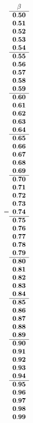  =\hbox{$\begin{array}{c}
 \bf \beta 
  \\ \hline 
\bf  0.50 \\ 
\bf  0.51 \\ 
\bf  0.52 \\ 
\bf  0.53 \\ 
\bf  0.54
  \\ \hline 
\bf  0.55 \\ 
\bf  0.56 \\ 
\bf  0.57 \\ 
\bf  0.58 \\ 
\bf  0.59
  \\ \hline 
\bf  0.60 \\ 
\bf  0.61 \\ 
\bf  0.62 \\ 
\bf  0.63 \\ 
\bf  0.64
  \\ \hline 
\bf  0.65 \\ 
\bf  0.66 \\ 
\bf  0.67 \\ 
\bf  0.68 \\ 
\bf  0.69
  \\ \hline 
\bf  0.70 \\ 
\bf  0.71 \\ 
\bf  0.72 \\ 
\bf  0.73 \\ 
\bf  0.74
  \\ \hline 
\bf  0.75 \\ 
\bf  0.76 \\ 
\bf  0.77 \\ 
\bf  0.78 \\ 
\bf  0.79
  \\ \hline 
\bf  0.80 \\ 
\bf  0.81 \\ 
\bf  0.82 \\ 
\bf  0.83 \\ 
\bf  0.84
  \\ \hline 
\bf  0.85 \\ 
\bf  0.86 \\ 
\bf  0.87 \\ 
\bf  0.88 \\ 
\bf  0.89
  \\ \hline 
\bf  0.90 \\ 
\bf  0.91 \\ 
\bf  0.92 \\ 
\bf  0.93 \\ 
\bf  0.94
  \\ \hline 
\bf  0.95 \\ 
\bf  0.96 \\ 
\bf  0.97 \\ 
\bf  0.98 \\ 
\bf  0.99
 \end{array}$}
